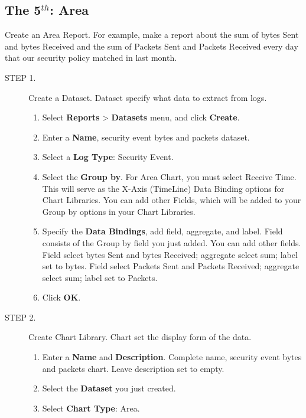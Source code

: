 \subsection*{\hypertarget{link:The 5th: Area}{The 5$^{th}$: Area}}
\label{sec:appendix_f:report:area}

Create an Area Report. For example, make a report about the sum of bytes Sent and bytes Received and the sum of Packets Sent and Packets Received every day that our security policy matched in last month.

\begin{description}
    \item[STEP 1.]	Create a Dataset. Dataset specify what data to extract from logs.
    \begin{enumerate}
        \item Select \textbf{Reports} > \textbf{Datasets} menu, and click \textbf{Create}.
        \item Enter a \textbf{Name}, security event bytes and packets dataset.
        \item Select a \textbf{Log Type}: Security Event.
        \item Select the \textbf{Group by}. For Area Chart, you must select Receive Time. This will serve as the X-Axis (TimeLine) Data Binding options for Chart Libraries. You can add other Fields, which will be added to your Group by options in your Chart Libraries.
        \item Specify the \textbf{Data Bindings}, add field, aggregate, and label. Field consists of the Group by field you just added. You can add other fields. Field select bytes Sent and bytes Received; aggregate select sum; label set to bytes. Field select Packets Sent and Packets Received; aggregate select sum; label set to Packets.
        \item Click \textbf{OK}.
    \end{enumerate}
    \item[STEP 2.]	Create Chart Library. Chart set the display form of the data.
    \begin{enumerate}
        \item Enter a \textbf{Name} and \textbf{Description}. Complete name, security event bytes and packets chart. Leave description set to empty.
        \item Select the \textbf{Dataset} you just created.
        \item Select \textbf{Chart Type}: Area. 

\end{enumerate}
\end{description}
